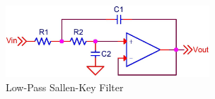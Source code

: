 \begin{figure}[ht!]
\includegraphics[keepaspectratio=true,width=3in]{./figures/circEx/skey.jpg}
\centering
\caption{Low-Pass Sallen-Key Filter~\cite{skey}}
\label{fig:skey}
\end{figure}

